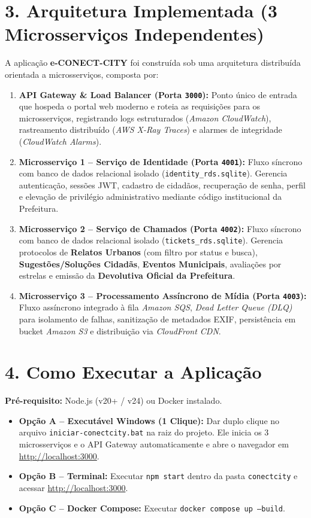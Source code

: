 \documentclass[12pt,a4paper]{article}
\begin{document}
\section*{3. Arquitetura Implementada (3 Microsserviços Independentes)}
A aplicação \textbf{e-CONECT-CITY} foi construída sob uma arquitetura distribuída orientada a microsserviços, composta por:
\begin{enumerate}[leftmargin=1.8em]
    \item \textbf{API Gateway \& Load Balancer (Porta \texttt{3000}):} Ponto único de entrada que hospeda o portal web moderno e roteia as requisições para os microsserviços, registrando logs estruturados (\textit{Amazon CloudWatch}), rastreamento distribuído (\textit{AWS X-Ray Traces}) e alarmes de integridade (\textit{CloudWatch Alarms}).
    \item \textbf{Microsserviço 1 -- Serviço de Identidade (Porta \texttt{4001}):} Fluxo síncrono com banco de dados relacional isolado (\texttt{identity\_rds.sqlite}). Gerencia autenticação, sessões JWT, cadastro de cidadãos, recuperação de senha, perfil e elevação de privilégio administrativo mediante código institucional da Prefeitura.
    \item \textbf{Microsserviço 2 -- Serviço de Chamados (Porta \texttt{4002}):} Fluxo síncrono com banco de dados relacional isolado (\texttt{tickets\_rds.sqlite}). Gerencia protocolos de \textbf{Relatos Urbanos} (com filtro por status e busca), \textbf{Sugestões/Soluções Cidadãs}, \textbf{Eventos Municipais}, avaliações por estrelas e emissão da \textbf{Devolutiva Oficial da Prefeitura}.
    \item \textbf{Microsserviço 3 -- Processamento Assíncrono de Mídia (Porta \texttt{4003}):} Fluxo assíncrono integrado à fila \textit{Amazon SQS}, \textit{Dead Letter Queue (DLQ)} para isolamento de falhas, sanitização de metadados EXIF, persistência em bucket \textit{Amazon S3} e distribuição via \textit{CloudFront CDN}.
\end{enumerate}

\section*{4. Como Executar a Aplicação}
\textbf{Pré-requisito:} Node.js (v20+ / v24) ou Docker instalado.
\begin{itemize}[leftmargin=1.5em]
    \item \textbf{Opção A -- Executável Windows (1 Clique):} Dar duplo clique no arquivo \texttt{iniciar-conectcity.bat} na raiz do projeto. Ele inicia os 3 microsserviços e o API Gateway automaticamente e abre o navegador em \url{http://localhost:3000}.
    \item \textbf{Opção B -- Terminal:} Executar \texttt{npm start} dentro da pasta \texttt{conectcity} e acessar \url{http://localhost:3000}.
    \item \textbf{Opção C -- Docker Compose:} Executar \texttt{docker compose up --build}.
\end{itemize}
\end{document}
